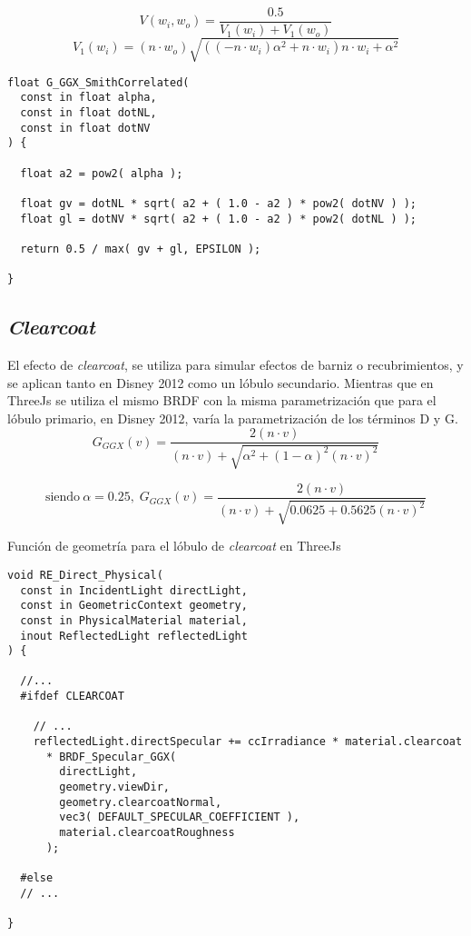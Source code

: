   $$
  V(w_i, w_o) = \frac{0.5}{V_1(w_i) + V_1(w_o)}
  $$
  \singlespacing
  \begin{equation}
    V_1(w_i) = (n \cdot{w_o}) \sqrt{((-n\cdot{w_i}) \alpha^2 + n\cdot{w_i}) n\cdot{w_i} + \alpha^2}
  \end{equation}



\begin{lstlisting}[caption=Clase MeshClothMaterial]
float G_GGX_SmithCorrelated(
  const in float alpha,
  const in float dotNL,
  const in float dotNV
) {

  float a2 = pow2( alpha );

  float gv = dotNL * sqrt( a2 + ( 1.0 - a2 ) * pow2( dotNV ) );
  float gl = dotNV * sqrt( a2 + ( 1.0 - a2 ) * pow2( dotNL ) );

  return 0.5 / max( gv + gl, EPSILON );

}
\end{lstlisting}

  \subsection*{\textit{Clearcoat}}
  El efecto de \textit{clearcoat}, se utiliza para simular efectos de barniz o recubrimientos, y se aplican tanto en Disney
  2012 como un l\'obulo secundario. Mientras que en ThreeJs se utiliza el mismo BRDF con la misma parametrizaci\'on que para
  el l\'obulo primario, en Disney 2012, var\'ia la parametrizaci\'on de los t\'erminos D y G.\\

  $$
  G_{GGX}(v) = \frac
  {2 (n \cdot{v})}
  {(n \cdot{v}) + \sqrt{ \alpha^2 + (1 - \alpha)^2 (n \cdot{v})^2 }}
  $$
  \begin{eqfloat}[!htb]
    \begin{equation}
    \textrm{siendo}\ \alpha=0.25,\;
    G_{GGX}(v) = \frac
    {2 (n \cdot{v})}
    {(n \cdot{v}) + \sqrt{ 0.0625 + 0.5625 (n \cdot{v})^2 }}
    \end{equation}
  \caption{Funci\'on de geometr\'ia para el l\'obulo de \textit{clearcoat} en ThreeJs}
  \end{eqfloat}
  \singlespacing

  \begin{lstlisting}[caption={Implementaci\'on del l\'obulo de \textit{clearcoat} en ThreeJs}]
void RE_Direct_Physical(
  const in IncidentLight directLight,
  const in GeometricContext geometry,
  const in PhysicalMaterial material,
  inout ReflectedLight reflectedLight
) {

  //...
  #ifdef CLEARCOAT

    // ...
    reflectedLight.directSpecular += ccIrradiance * material.clearcoat
      * BRDF_Specular_GGX(
        directLight,
        geometry.viewDir,
        geometry.clearcoatNormal,
        vec3( DEFAULT_SPECULAR_COEFFICIENT ),
        material.clearcoatRoughness
      );

  #else
  // ...

}
  \end{lstlisting}
  
